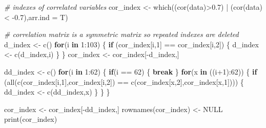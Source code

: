 \documentclass[12pt,twoside]{deuthesis}
\newenvironment{Shaded}{\begin{snugshade}}{\end{snugshade}}
\newcommand{\AttributeTok}[1]{\textcolor[rgb]{0.77,0.63,0.00}{#1}}
\newcommand{\CommentTok}[1]{\textcolor[rgb]{0.56,0.35,0.01}{\textit{#1}}}
\newcommand{\ConstantTok}[1]{\textcolor[rgb]{0.00,0.00,0.00}{#1}}
\newcommand{\ControlFlowTok}[1]{\textcolor[rgb]{0.13,0.29,0.53}{\textbf{#1}}}
\newcommand{\DecValTok}[1]{\textcolor[rgb]{0.00,0.00,0.81}{#1}}
\newcommand{\FloatTok}[1]{\textcolor[rgb]{0.00,0.00,0.81}{#1}}
\newcommand{\FunctionTok}[1]{\textcolor[rgb]{0.00,0.00,0.00}{#1}}
\newcommand{\NormalTok}[1]{#1}
\newcommand{\OtherTok}[1]{\textcolor[rgb]{0.56,0.35,0.01}{#1}}
\newcommand{\SpecialCharTok}[1]{\textcolor[rgb]{0.00,0.00,0.00}{#1}}
\begin{document}
\begin{Shaded}
\begin{Highlighting}[]
\CommentTok{\# indexes of correlated variables}
\NormalTok{cor\_index }\OtherTok{\textless{}{-}} \FunctionTok{which}\NormalTok{((}\FunctionTok{cor}\NormalTok{(data)}\SpecialCharTok{\textgreater{}}\FloatTok{0.7}\NormalTok{) }\SpecialCharTok{|}\NormalTok{ (}\FunctionTok{cor}\NormalTok{(data)}\SpecialCharTok{\textless{}} \SpecialCharTok{{-}}\FloatTok{0.7}\NormalTok{),}\AttributeTok{arr.ind =}\NormalTok{ T) }

\CommentTok{\# correlation matrix is a symmetric matrix so repeated indexes are deleted}
\NormalTok{d\_index }\OtherTok{\textless{}{-}} \FunctionTok{c}\NormalTok{()}
\ControlFlowTok{for}\NormalTok{(i }\ControlFlowTok{in} \DecValTok{1}\SpecialCharTok{:}\DecValTok{103}\NormalTok{) \{}
  \ControlFlowTok{if}\NormalTok{ (cor\_index[i,}\DecValTok{1}\NormalTok{] }\SpecialCharTok{==}\NormalTok{ cor\_index[i,}\DecValTok{2}\NormalTok{]) \{}
\NormalTok{    d\_index }\OtherTok{\textless{}{-}} \FunctionTok{c}\NormalTok{(d\_index,i)}
\NormalTok{  \}}
\NormalTok{\}}
\NormalTok{cor\_index }\OtherTok{\textless{}{-}}\NormalTok{ cor\_index[}\SpecialCharTok{{-}}\NormalTok{d\_index,]}

\NormalTok{dd\_index }\OtherTok{\textless{}{-}} \FunctionTok{c}\NormalTok{()}
\ControlFlowTok{for}\NormalTok{(i }\ControlFlowTok{in} \DecValTok{1}\SpecialCharTok{:}\DecValTok{62}\NormalTok{) \{}
  \ControlFlowTok{if}\NormalTok{(i }\SpecialCharTok{==} \DecValTok{62}\NormalTok{) \{}
    \ControlFlowTok{break}
\NormalTok{  \}}
  \ControlFlowTok{for}\NormalTok{(x }\ControlFlowTok{in}\NormalTok{ ((i}\SpecialCharTok{+}\DecValTok{1}\NormalTok{)}\SpecialCharTok{:}\DecValTok{62}\NormalTok{)) \{}
    \ControlFlowTok{if}\NormalTok{ (}\FunctionTok{all}\NormalTok{(}\FunctionTok{c}\NormalTok{(cor\_index[i,}\DecValTok{1}\NormalTok{],cor\_index[i,}\DecValTok{2}\NormalTok{]) }\SpecialCharTok{==} \FunctionTok{c}\NormalTok{(cor\_index[x,}\DecValTok{2}\NormalTok{],cor\_index[x,}\DecValTok{1}\NormalTok{]))) \{}
\NormalTok{      dd\_index }\OtherTok{\textless{}{-}} \FunctionTok{c}\NormalTok{(dd\_index,x)}
\NormalTok{    \}}
\NormalTok{  \}}
\NormalTok{\}}


\NormalTok{cor\_index }\OtherTok{\textless{}{-}}\NormalTok{ cor\_index[}\SpecialCharTok{{-}}\NormalTok{dd\_index,]}
\FunctionTok{rownames}\NormalTok{(cor\_index) }\OtherTok{\textless{}{-}} \ConstantTok{NULL}
\FunctionTok{print}\NormalTok{(cor\_index)}
\end{Highlighting}
\end{Shaded}
\end{document}
